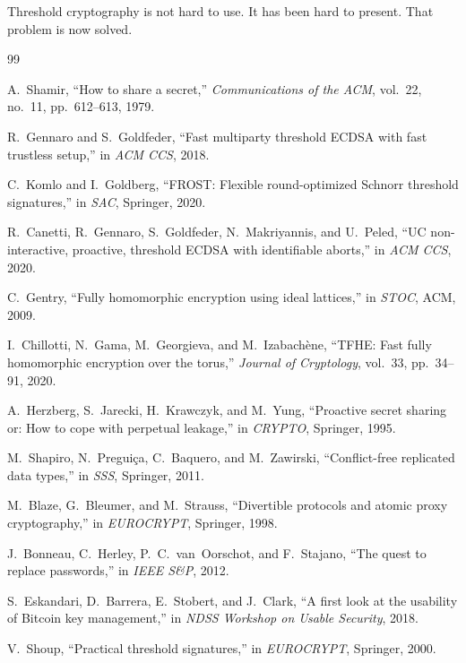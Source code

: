 \documentclass[11pt,a4paper]{article}
\begin{document}
Threshold cryptography is not hard to use. It has been hard to present.
That problem is now solved.

\begin{thebibliography}{99}

A.~Shamir, ``How to share a secret,'' \emph{Communications of the ACM}, vol.~22, no.~11, pp.~612--613, 1979.

R.~Gennaro and S.~Goldfeder, ``Fast multiparty threshold ECDSA with fast trustless setup,'' in \emph{ACM CCS}, 2018.

C.~Komlo and I.~Goldberg, ``FROST: Flexible round-optimized Schnorr threshold signatures,'' in \emph{SAC}, Springer, 2020.

R.~Canetti, R.~Gennaro, S.~Goldfeder, N.~Makriyannis, and U.~Peled, ``UC non-interactive, proactive, threshold ECDSA with identifiable aborts,'' in \emph{ACM CCS}, 2020.

C.~Gentry, ``Fully homomorphic encryption using ideal lattices,'' in \emph{STOC}, ACM, 2009.

I.~Chillotti, N.~Gama, M.~Georgieva, and M.~Izabach\`ene, ``TFHE: Fast fully homomorphic encryption over the torus,'' \emph{Journal of Cryptology}, vol.~33, pp.~34--91, 2020.

A.~Herzberg, S.~Jarecki, H.~Krawczyk, and M.~Yung, ``Proactive secret sharing or: How to cope with perpetual leakage,'' in \emph{CRYPTO}, Springer, 1995.

M.~Shapiro, N.~Pregui\c{c}a, C.~Baquero, and M.~Zawirski, ``Conflict-free replicated data types,'' in \emph{SSS}, Springer, 2011.

M.~Blaze, G.~Bleumer, and M.~Strauss, ``Divertible protocols and atomic proxy cryptography,'' in \emph{EUROCRYPT}, Springer, 1998.

J.~Bonneau, C.~Herley, P.~C.~van~Oorschot, and F.~Stajano, ``The quest to replace passwords,'' in \emph{IEEE S\&P}, 2012.

S.~Eskandari, D.~Barrera, E.~Stobert, and J.~Clark, ``A first look at the usability of Bitcoin key management,'' in \emph{NDSS Workshop on Usable Security}, 2018.

V.~Shoup, ``Practical threshold signatures,'' in \emph{EUROCRYPT}, Springer, 2000.

\end{thebibliography}
\end{document}
